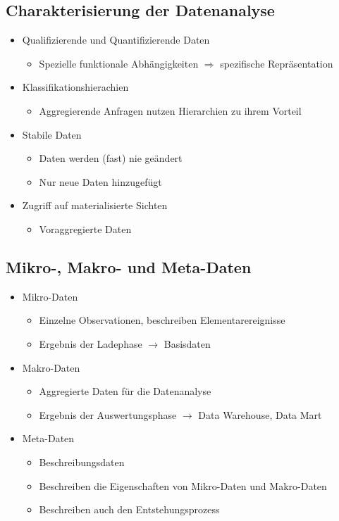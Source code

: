 \subsection{Charakterisierung der Datenanalyse}
\begin{itemize}
	\item Qualifizierende und Quantifizierende Daten
		\begin{itemize}
			\item Spezielle funktionale Abhängigkeiten $\Rightarrow$ spezifische Repräsentation
		\end{itemize}
	\item Klassifikationshierachien
		\begin{itemize}
			\item Aggregierende Anfragen nutzen Hierarchien zu ihrem Vorteil
		\end{itemize}
	\item Stabile Daten
		\begin{itemize}
			\item Daten werden (fast) nie geändert
			\item Nur neue Daten hinzugefügt
		\end{itemize}
	\item Zugriff auf materialisierte Sichten
		\begin{itemize}
			\item Voraggregierte Daten
		\end{itemize}
\end{itemize}
\subsection{Mikro-, Makro- und Meta-Daten}
\begin{itemize}
	\item Mikro-Daten
		\begin{itemize}
			\item Einzelne Observationen, beschreiben Elementarereignisse
			\item Ergebnis der Ladephase $\rightarrow$ Basisdaten
		\end{itemize}
	\item Makro-Daten
		\begin{itemize}
			\item Aggregierte Daten für die Datenanalyse
			\item Ergebnis der Auswertungsphase $\rightarrow$ Data Warehouse, Data Mart
		\end{itemize}
	\item Meta-Daten
		\begin{itemize}
			\item Beschreibungsdaten
			\item Beschreiben die Eigenschaften von Mikro-Daten und Makro-Daten
			\item Beschreiben auch den Entstehungsprozess
		\end{itemize}
\end{itemize}
